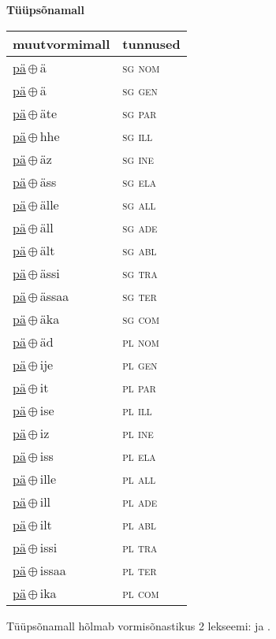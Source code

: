 

\vspace{3.5em}
\noindent \begin{minipage}{\textwidth}
\noindent \textbf{Tüüpsõnamall \,}\\

\begin{sideways}
\begin{tabular}{l l}
muutvormimall & tunnused \\
\hline
\underline{pä}\,$\oplus$\,ä & \textsc{ sg nom } \\
\underline{pä}\,$\oplus$\,ä & \textsc{ sg gen } \\
\underline{pä}\,$\oplus$\,äte & \textsc{ sg par } \\
\underline{pä}\,$\oplus$\,hhe & \textsc{ sg ill } \\
\underline{pä}\,$\oplus$\,äz & \textsc{ sg ine } \\
\underline{pä}\,$\oplus$\,äss & \textsc{ sg ela } \\
\underline{pä}\,$\oplus$\,älle & \textsc{ sg all } \\
\underline{pä}\,$\oplus$\,äll & \textsc{ sg ade } \\
\underline{pä}\,$\oplus$\,ält & \textsc{ sg abl } \\
\underline{pä}\,$\oplus$\,ässi & \textsc{ sg tra } \\
\underline{pä}\,$\oplus$\,ässaa & \textsc{ sg ter } \\
\underline{pä}\,$\oplus$\,äka & \textsc{ sg com } \\
\underline{pä}\,$\oplus$\,äd & \textsc{ pl nom } \\
\underline{pä}\,$\oplus$\,ije & \textsc{ pl gen } \\
\underline{pä}\,$\oplus$\,it & \textsc{ pl par } \\
\underline{pä}\,$\oplus$\,ise & \textsc{ pl ill } \\
\underline{pä}\,$\oplus$\,iz & \textsc{ pl ine } \\
\underline{pä}\,$\oplus$\,iss & \textsc{ pl ela } \\
\underline{pä}\,$\oplus$\,ille & \textsc{ pl all } \\
\underline{pä}\,$\oplus$\,ill & \textsc{ pl ade } \\
\underline{pä}\,$\oplus$\,ilt & \textsc{ pl abl } \\
\underline{pä}\,$\oplus$\,issi & \textsc{ pl tra } \\
\underline{pä}\,$\oplus$\,issaa & \textsc{ pl ter } \\
\underline{pä}\,$\oplus$\,ika & \textsc{ pl com } \\
\end{tabular}
\end{sideways}
\label{tab:tüüpsõnamall-pää}

\end{minipage}

 
\vspace{1em}
\noindent Tüüpsõnamall  hõlmab vormisõnastikus 2 lekseemi:  ja .
